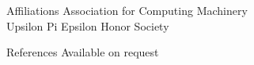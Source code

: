 \documentclass{resume} %
\begin{document}
\begin{rSection}{Affiliations}
Association for Computing Machinery \\
Upsilon Pi Epsilon Honor Society
\end{rSection}



\begin{rSection}{References}
Available on request
\end{rSection}





\end{document}
